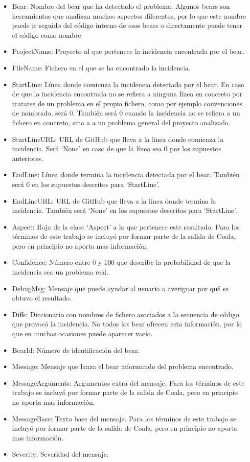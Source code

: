 \documentclass[a4paper, 12pt]{book}
\begin{document}
\begin{itemize}
          \item Bear: Nombre del bear que ha detectado el problema. Algunos bears son herramientas que analizan muchos aspectos diferentes, por lo que este nombre puede ir seguido del código interno de esos bears o directamente puede tener el código como nombre.
          \item ProjectName: Proyecto al que pertenece la incidencia encontrada por el bear.
          \item FileName: Fichero en el que se ha encontrado la incidencia.
          \item StartLine: Línea donde comienza la incidencia detectada por el bear. En caso de que la incidencia encontrada no se refiera a ninguna línea en concreto por tratarse de un problema en el propio fichero, como por ejemplo convenciones de nombrado, será 0. También será 0 cuando la incidencia no se refiera a un fichero en concreto, sino a a un problema general del proyecto analizado.
          \item StartLineURL: URL de GitHub que lleva a la línea donde comienza la incidencia. Será `None' en caso de que la línea sea 0 por los supuestos anteriores.
          \item EndLine: Línea donde termina la incidencia detectada por el bear. También será 0 en los supuestos descritos para `StartLine'.
          \item EndLineURL: URL de GitHub que lleva a la línea donde termina la incidencia. También será `None' en los supuestos descritos para `StartLine'.
          \item Aspect: Hoja de la clase `Aspect' a la que pertenece este resultado. Para los términos de este trabajo se incluyó por formar parte de la salida de Coala, pero en principio no aporta mas información.
          \item Confidence: Número entre 0 y 100 que describe la probabilidad de que la incidencia sea un problema real.
          \item DebugMsg: Mensaje que puede ayudar al usuario a averiguar por qué se obtuvo el resultado.
          \item Diffs: Diccionario con nombres de fichero asociados a la secuencia de código que provocó la incidencia. No todos los bear ofrecen esta información, por lo que en muchas ocasiones puede aparecer vacío.
          \item BearId: Número de identificación del bear.
          \item Message: Mensaje que lanza el bear informando del problema encontrado.
          \item MessageArguments: Argumentos extra del mensaje. Para los términos de este trabajo se incluyó por formar parte de la salida de Coala, pero en principio no aporta mas información.
          \item MessageBase: Texto base del mensaje. Para los términos de este trabajo se incluyó por formar parte de la salida de Coala, pero en principio no aporta mas información.
          \item Severity: Severidad del mensaje.
\end{itemize}
\end{document}
